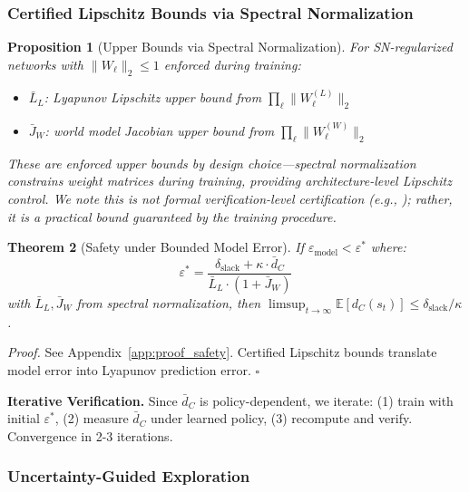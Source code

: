 \documentclass{article}
\theoremstyle{plain}
\newtheorem{theorem}{Theorem}[section]
\newtheorem{proposition}[theorem]{Proposition}
\theoremstyle{definition}
\theoremstyle{remark}
\begin{document}
\subsubsection{Certified Lipschitz Bounds via Spectral Normalization}

\begin{proposition}[Upper Bounds via Spectral Normalization]
\label{prop:lipschitz}
For SN-regularized networks \citep{miyato2018spectral} with $\|W_\ell\|_2 \leq 1$ enforced during training:
\begin{itemize}
    \item $\bar{L}_L$: Lyapunov Lipschitz upper bound from $\prod_\ell \|W_\ell^{(L)}\|_2$
    \item $\bar{J}_W$: world model Jacobian upper bound from $\prod_\ell \|W_\ell^{(W)}\|_2$
\end{itemize}
These are enforced \emph{upper bounds} by design choice---spectral normalization constrains weight matrices during training, providing architecture-level Lipschitz control. We note this is not formal verification-level certification (e.g., \citet{fazlyab2019efficient}); rather, it is a practical bound guaranteed by the training procedure.
\end{proposition}

\begin{theorem}[Safety under Bounded Model Error]
\label{thm:safety}
If $\varepsilon_{\text{model}} < \varepsilon^*$ where:
\begin{equation}
\varepsilon^* = \frac{\delta_{\text{slack}} + \kappa \cdot \bar{d}_C}{\bar{L}_L \cdot (1 + \bar{J}_W)}
\label{eq:eps_star}
\end{equation}
with $\bar{L}_L, \bar{J}_W$ from spectral normalization, then $\limsup_{t \to \infty} \mathbb{E}[d_C(s_t)] \leq \delta_{\text{slack}}/\kappa$.
\end{theorem}

\emph{Proof.} See Appendix~\ref{app:proof_safety}. Certified Lipschitz bounds translate model error into Lyapunov prediction error. \hfill $\square$

\textbf{Iterative Verification.} Since $\bar{d}_C$ is policy-dependent, we iterate: (1) train with initial $\varepsilon^*$, (2) measure $\bar{d}_C$ under learned policy, (3) recompute and verify. Convergence in 2-3 iterations.

\subsubsection{Uncertainty-Guided Exploration}
\end{document}
